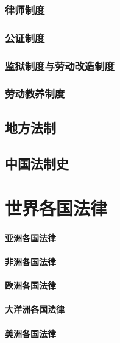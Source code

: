 \documentclass[UTF8]{../ApplicationUniverse}
\begin{document}
    \subsection{律师制度}
    \subsection{公证制度}
    \subsection{监狱制度与劳动改造制度}
    \subsection{劳动教养制度}

\section{地方法制}
\section{中国法制史}









\chapter{世界各国法律}

\subsubsection{亚洲各国法律}
\subsubsection{非洲各国法律}
\subsubsection{欧洲各国法律}
\subsubsection{大洋洲各国法律}
\subsubsection{美洲各国法律}
\end{document}

